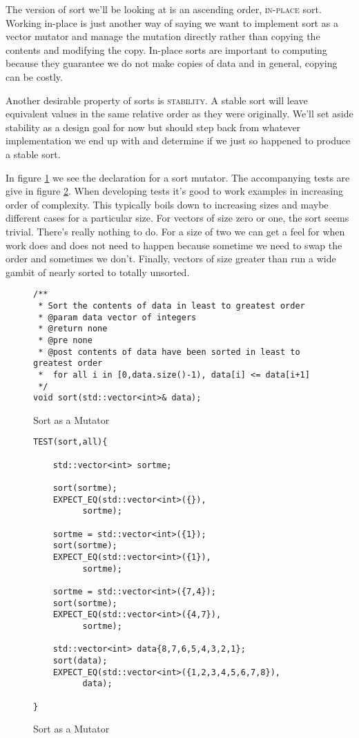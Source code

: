 \documentclass[]{tufte-handout}
\begin{document}
The version of sort we'll be looking at is an ascending order, \textsc{in-place} sort. Working in-place is just another way of saying we want to implement sort as a vector mutator and manage the mutation directly rather than copying the contents and modifying the copy. In-place sorts are important to computing because they guarantee we do not make copies of data and in general, copying can be costly. 

Another desirable property of sorts is \textsc{stability}. A stable sort will leave equivalent values in the same relative order as they were originally. We'll set aside stability as a design goal for now but should step back from whatever implementation we end up with and determine if we just so happened to produce a stable sort. 

In figure \ref{code:sortdecl} we see the declaration for a sort mutator. The accompanying tests are give in figure \ref{code:sorttests}. When developing tests it's good to work examples in increasing order of complexity. This typically boils down to increasing sizes and maybe different cases for a particular size. For vectors of size zero or one, the sort seems trivial. There's really nothing to do. For a size of two we can get a feel for when work does and does not need to happen because sometime we need to swap the order and sometimes we don't. Finally, vectors of size greater than run a wide gambit of nearly sorted to totally unsorted. 

\begin{figure}[htbp!]
\begin{lstlisting}
/**
 * Sort the contents of data in least to greatest order
 * @param data vector of integers
 * @return none
 * @pre none
 * @post contents of data have been sorted in least to greatest order
 *  for all i in [0,data.size()-1), data[i] <= data[i+1]
 */
void sort(std::vector<int>& data);
\end{lstlisting}
\label{code:sortdecl}
\caption{Sort as a Mutator}
\end{figure}

\begin{figure}[htbp!]
\begin{lstlisting}
TEST(sort,all){

	std::vector<int> sortme;

 	sort(sortme);
    EXPECT_EQ(std::vector<int>({}),
	      sortme);

    sortme = std::vector<int>({1});
	sort(sortme);
    EXPECT_EQ(std::vector<int>({1}),
	      sortme);

    sortme = std::vector<int>({7,4});
	sort(sortme);
    EXPECT_EQ(std::vector<int>({4,7}),
	      sortme);

    std::vector<int> data{8,7,6,5,4,3,2,1};
	sort(data);
    EXPECT_EQ(std::vector<int>({1,2,3,4,5,6,7,8}),
	      data);

}
\end{lstlisting}
\label{code:sorttests}
\caption{Sort as a Mutator}
\end{figure}
\end{document}
